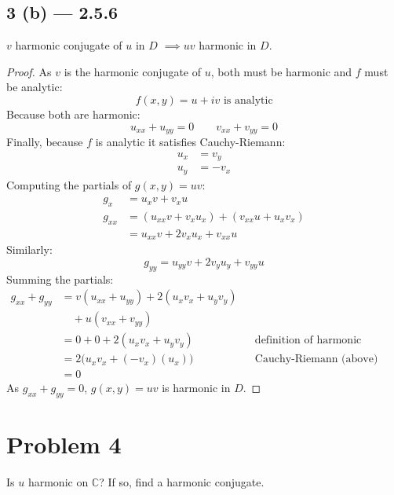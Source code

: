 \documentclass{article}
\begin{document}
\subsection*{3 (b) --- 2.5.6}
$v$ harmonic conjugate of $u$ in $D$ $\implies uv$ harmonic in $D$.
\begin{proof}
  As $v$ is the harmonic conjugate of $u$, both must be harmonic and $f$ must
  be analytic:
  \[
    f(x, y) = u + iv \text{ is analytic}
  \]
  Because both are harmonic:
  \[
    u_{xx} + u_{yy} = 0 \qquad v_{xx} + v_{yy} = 0
  \]
  Finally, because $f$ is analytic it satisfies Cauchy-Riemann:
  \begin{align*}
    u_x &= v_y
    \\ u_y &= -v_x
  \end{align*}
  Computing the partials of $g(x, y) = uv$:
  \begin{align*}
    g_x &= u_x v + v_x u
    \\ g_{xx} &= (u_{xx} v + v_x u_x) + (v_{xx} u + u_x v_x)
    \\ &= u_{xx} v + 2 v_x u_x + v_{xx} u
  \end{align*}
  Similarly:
  \[
    g_{yy} = u_{yy} v + 2 v_y u_y + v_{yy} u
  \]
  Summing the partials:
  \begin{align*}
    g_{xx} + g_{yy}
    &= v(u_{xx} + u_{yy}) + 2(u_x v_x + u_y v_y)
    \\ &\quad + u(v_{xx} + v_{yy})
    \\ &= 0 + 0 + 2(u_x v_x + u_y v_y)
    && \text{definition of harmonic (above)}
    \\ &= 2\big(u_x v_x + (-v_x)(u_x)\big)
    && \text{Cauchy-Riemann (above)}
    \\ &= 0
  \end{align*}
  As $g_{xx} + g_{yy} = 0$, $g(x, y) = uv$ is harmonic in $D$.
\end{proof}

\section*{Problem 4}
Is $u$ harmonic on $\mathbb{C}$? If so, find a harmonic conjugate.
\end{document}
